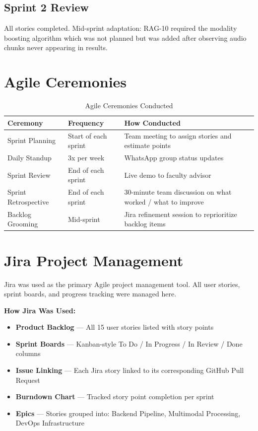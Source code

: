 \documentclass[12pt,a4paper]{report}
\begin{document}
\subsection{Sprint 2 Review}
All stories completed. Mid-sprint adaptation: RAG-10 required the modality boosting algorithm which was not planned but was added after observing audio chunks never appearing in results.

\section{Agile Ceremonies}

\begin{table}[H]
\centering
\caption{Agile Ceremonies Conducted}
\begin{tabular}{p{3.5cm}p{3cm}p{7cm}}
\toprule
\textbf{Ceremony} & \textbf{Frequency} & \textbf{How Conducted} \\
\midrule
Sprint Planning & Start of each sprint & Team meeting to assign stories and estimate points \\
Daily Standup & 3x per week & WhatsApp group status updates \\
Sprint Review & End of each sprint & Live demo to faculty advisor \\
Sprint Retrospective & End of each sprint & 30-minute team discussion on what worked / what to improve \\
Backlog Grooming & Mid-sprint & Jira refinement session to reprioritize backlog items \\
\bottomrule
\end{tabular}
\end{table}

\section{Jira Project Management}

Jira was used as the primary Agile project management tool. All user stories, sprint boards, and progress tracking were managed here.

\begin{mdframed}[style=toolbox]
\textbf{How Jira Was Used:}
\begin{itemize}[leftmargin=1.5cm]
    \item \textbf{Product Backlog} --- All 15 user stories listed with story points
    \item \textbf{Sprint Boards} --- Kanban-style To Do / In Progress / In Review / Done columns
    \item \textbf{Issue Linking} --- Each Jira story linked to its corresponding GitHub Pull Request
    \item \textbf{Burndown Chart} --- Tracked story point completion per sprint
    \item \textbf{Epics} --- Stories grouped into: Backend Pipeline, Multimodal Processing, DevOps Infrastructure
\end{itemize}
\end{mdframed}
\end{document}
